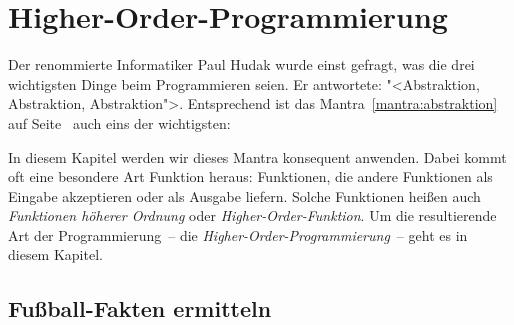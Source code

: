 
\chapter{Higher-Order-Programmierung}
\label{cha:higher-order}

Der renommierte Informatiker Paul Hudak wurde einst gefragt, was die
drei wichtigsten Dinge beim Programmieren seien.  Er antwortete:
"<Abstraktion, Abstraktion, Abstraktion">.  Entsprechend ist das
Mantra~\ref{mantra:abstraktion} auf Seite~\pageref{mantra:abstraktion}
auch eins der wichtigsten:

\mantraabstraktion*

\noindent In diesem Kapitel werden wir dieses Mantra konsequent anwenden.  Dabei
kommt oft eine besondere Art Funktion heraus: Funktionen, die andere
Funktionen als Eingabe akzeptieren oder als Ausgabe liefern.  Solche
Funktionen heißen auch \textit{Funktionen höherer
  Ordnung} oder
\textit{Higher-Order-Funktion}.  Um die
resultierende Art der Programmierung~-- die
\textit{Higher-Order-Programmierung}~-- geht es in diesem Kapitel.

\section{Fußball-Fakten ermitteln}

